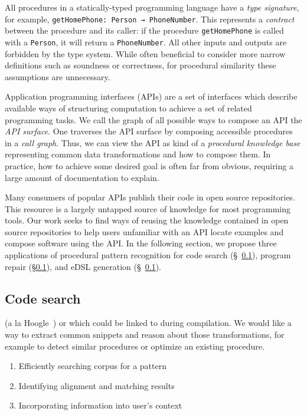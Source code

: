 \documentclass[11pt]{article}
\begin{document}
    All procedures in a statically-typed programming language have a \textit{type signature}, for example, \texttt{getHomePhone: Person → PhoneNumber}. This represents a \textit{contract} between the procedure and its caller: if the procedure \texttt{getHomePhone} is called with a \texttt{Person}, it will return a \texttt{PhoneNumber}. All other inputs and outputs are forbidden by the type system. While often beneficial to consider more narrow definitions such as soundness or correctness, for procedural similarity these assumptions are unnecessary.

    Application programming interfaces (APIs) are a set of interfaces which describe available ways of structuring computation to achieve a set of related programming tasks. We call the graph of all possible ways to compose an API the \textit{API surface}. One traverses the API surface by composing accessible procedures in a \textit{call graph}. Thus, we can view the API as kind of a \textit{procedural knowledge base} representing common data transformations and how to compose them. In practice, how to achieve some desired goal is often far from obvious, requiring a large amount of documentation to explain.

    Many consumers of popular APIs publish their code in open source repositories. This resource is a largely untapped source of knowledge for most programming tools. Our work seeks to find ways of reusing the knowledge contained in open source repositories to help users unfamiliar with an API locate examples and compose software using the API. In the following section, we propose three applications of procedural pattern recognition for code search (\S~\ref{subsec:code-search}), program repair (\S\ref{subsec:code-search}), and eDSL generation (\S~\ref{subsec:code-search}).

    \subsection{Code search}\label{subsec:code-search}

    (a la Hoogle~\citep{james2020digging}) or which could be linked to during compilation. We would like a way to extract common snippets and reason about those transformations, for example to detect similar procedures or optimize an existing procedure.

    \begin{enumerate}
        \item Efficiently searching corpus for a pattern
        \item Identifying alignment and matching results
        \item Incorporating information into user's context
    \end{enumerate}
\end{document}
